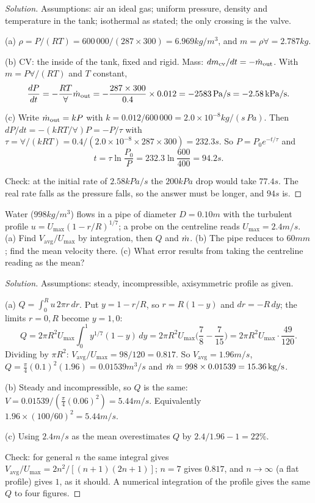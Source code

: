 \begin{proof}[Solution]
Assumptions: air an ideal gas; uniform pressure, density and temperature in the tank; isothermal as stated; the only crossing is the valve.

(a) $\rho = P/(RT) = 600\,000/(287\times300) = 6.969\unit{kg/m^3}$, and $m = \rho\forall = 2.787\unit{kg}$.

(b) CV: the inside of the tank, fixed and rigid. Mass: $dm_\text{cv}/dt = -\dot m_\text{out}$. With $m = P\forall/(RT)$ and $T$ constant,
\[
\frac{dP}{dt} = -\frac{RT}{\forall}\dot m_\text{out} = -\frac{287\times 300}{0.4}\times 0.012 = -2583\,\mathrm{Pa/s} = -2.58\,\mathrm{kPa/s}.
\]

(c) Write $\dot m_\text{out} = kP$ with $k = 0.012/600\,000 = 2.0\times10^{-8}\unit{kg/(s\,Pa)}$. Then $dP/dt = -(kRT/\forall)P = -P/\tau$ with $\tau = \forall/(kRT) = 0.4/(2.0\times10^{-8}\times287\times300) = 232.3\unit{s}$. So $P = P_0e^{-t/\tau}$ and
\[
t = \tau\ln\frac{P_0}{P} = 232.3\ln\frac{600}{400} = 94.2\unit{s}.
\]

Check: at the initial rate of $2.58\unit{kPa/s}$ the $200\unit{kPa}$ drop would take $77.4\unit{s}$. The real rate falls as the pressure falls, so the answer must be longer, and $94\unit{s}$ is.
\end{proof}

\begin{example}
Water ($998\unit{kg/m^3}$) flows in a pipe of diameter $D = 0.10\unit{m}$ with the turbulent profile $u = U_\text{max}(1 - r/R)^{1/7}$; a probe on the centreline reads $U_\text{max} = 2.4\unit{m/s}$. (a) Find $V_\text{avg}/U_\text{max}$ by integration, then $Q$ and $\dot m$. (b) The pipe reduces to $60\unit{mm}$; find the mean velocity there. (c) What error results from taking the centreline reading as the mean?
\end{example}

\begin{proof}[Solution]
Assumptions: steady, incompressible, axisymmetric profile as given.

(a) $Q = \int_0^R u\,2\pi r\,dr$. Put $y = 1 - r/R$, so $r = R(1-y)$ and $dr = -R\,dy$; the limits $r = 0, R$ become $y = 1, 0$:
\[
Q = 2\pi R^2U_\text{max}\int_0^1 y^{1/7}(1 - y)\,dy = 2\pi R^2 U_\text{max}\Big(\frac{7}{8} - \frac{7}{15}\Big) = 2\pi R^2U_\text{max}\cdot\frac{49}{120}.
\]
Dividing by $\pi R^2$: $V_\text{avg}/U_\text{max} = 98/120 = 0.817$. So $V_\text{avg} = 1.96\unit{m/s}$, $Q = \tfrac{\pi}{4}(0.1)^2(1.96) = 0.01539\unit{m^3/s}$ and $\dot m = 998\times0.01539 = 15.36\,\mathrm{kg/s}$.

(b) Steady and incompressible, so $Q$ is the same: $V = 0.01539/(\tfrac{\pi}{4}(0.06)^2) = 5.44\unit{m/s}$. Equivalently $1.96\times(100/60)^2 = 5.44\unit{m/s}$.

(c) Using $2.4\unit{m/s}$ as the mean overestimates $Q$ by $2.4/1.96 - 1 = 22\%$.

Check: for general $n$ the same integral gives $V_\text{avg}/U_\text{max} = 2n^2/[(n+1)(2n+1)]$; $n = 7$ gives $0.817$, and $n \to \infty$ (a flat profile) gives $1$, as it should. A numerical integration of the profile gives the same $Q$ to four figures.
\end{proof}

